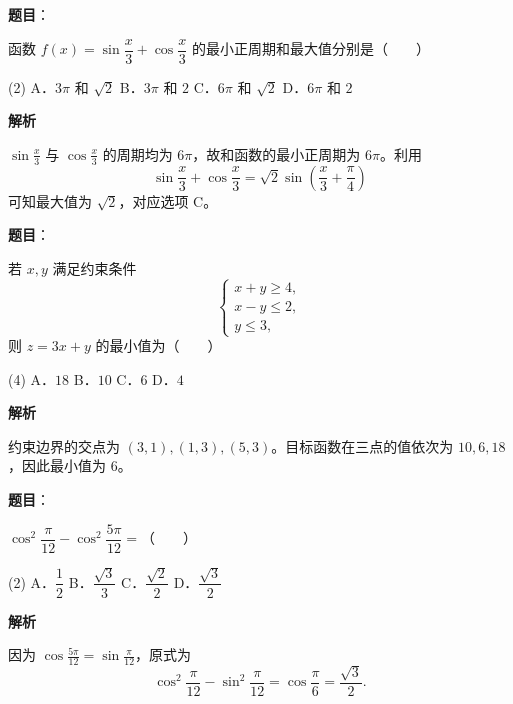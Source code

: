 \begin{answer}

\textbf{题目}：

函数 $f(x)=\sin\dfrac{x}{3}+\cos\dfrac{x}{3}$ 的最小正周期和最大值分别是\mbox{（　　）}

\begin{gkopts}(2)
\task A．$3\pi$ 和 $\sqrt2$
\task B．$3\pi$ 和 $2$
\task C．$6\pi$ 和 $\sqrt2$
\task D．$6\pi$ 和 $2$
\end{gkopts}

\textbf{解析}

$\sin\frac x3$ 与 $\cos\frac x3$ 的周期均为 $6\pi$，故和函数的最小正周期为 $6\pi$。利用
\nopagebreak[4]
\[
\sin\frac x3+\cos\frac x3=\sqrt2\sin\left(\frac x3+\frac\pi4\right)
\]
可知最大值为 $\sqrt2$，对应选项 C。


\end{answer}
\begin{answer}

\textbf{题目}：

若 $x,y$ 满足约束条件
\nopagebreak[4]
\[
\begin{cases}
x+y\geqslant4,\\
x-y\leqslant2,\\
y\leqslant3,
\end{cases}
\]
则 $z=3x+y$ 的最小值为\mbox{（　　）}

\begin{gkopts}(4)
\task A．$18$
\task B．$10$
\task C．$6$
\task D．$4$
\end{gkopts}

\textbf{解析}

约束边界的交点为 $(3,1),(1,3),(5,3)$。目标函数在三点的值依次为 $10,6,18$，因此最小值为 $6$。


\end{answer}
\begin{answer}

\textbf{题目}：

$\cos^2\dfrac{\pi}{12}-\cos^2\dfrac{5\pi}{12}=$\mbox{（　　）}

\begin{gkopts}(2)
\task A．$\dfrac12$
\task B．$\dfrac{\sqrt3}{3}$
\task C．$\dfrac{\sqrt2}{2}$
\task D．$\dfrac{\sqrt3}{2}$
\end{gkopts}

\textbf{解析}

因为 $\cos\frac{5\pi}{12}=\sin\frac\pi{12}$，原式为
\nopagebreak[4]
\[
\cos^2\frac\pi{12}-\sin^2\frac\pi{12}
=\cos\frac\pi6=\frac{\sqrt3}{2}.
\]


\end{answer}
